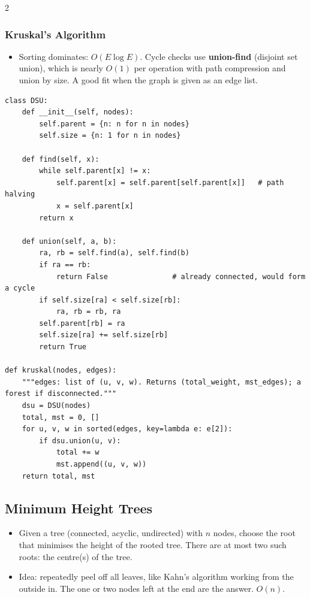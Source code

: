 \documentclass[9pt,a4paper]{extarticle}
\newlength{\tw}
\begin{document}
\begin{multicols}{2}
\subsubsection{Kruskal's Algorithm}

\begin{itemize}
\item Sorting dominates: $O(E \log E)$. Cycle checks use \textbf{union-find} (disjoint set union), which is nearly $O(1)$ per operation with path compression and union by size. A good fit when the graph is given as an edge list.
\end{itemize}

\begin{lstlisting}
class DSU:
    def __init__(self, nodes):
        self.parent = {n: n for n in nodes}
        self.size = {n: 1 for n in nodes}

    def find(self, x):
        while self.parent[x] != x:
            self.parent[x] = self.parent[self.parent[x]]   # path halving
            x = self.parent[x]
        return x

    def union(self, a, b):
        ra, rb = self.find(a), self.find(b)
        if ra == rb:
            return False               # already connected, would form a cycle
        if self.size[ra] < self.size[rb]:
            ra, rb = rb, ra
        self.parent[rb] = ra
        self.size[ra] += self.size[rb]
        return True

def kruskal(nodes, edges):
    """edges: list of (u, v, w). Returns (total_weight, mst_edges); a forest if disconnected."""
    dsu = DSU(nodes)
    total, mst = 0, []
    for u, v, w in sorted(edges, key=lambda e: e[2]):
        if dsu.union(u, v):
            total += w
            mst.append((u, v, w))
    return total, mst
\end{lstlisting}

\subsection{Minimum Height Trees}

\begin{itemize}
\item Given a tree (connected, acyclic, undirected) with $n$ nodes, choose the root that minimises the height of the rooted tree. There are at most two such roots: the centre(s) of the tree.
\item Idea: repeatedly peel off all leaves, like Kahn's algorithm working from the outside in. The one or two nodes left at the end are the answer. $O(n)$.
\end{itemize}


\end{multicols}
\end{document}
